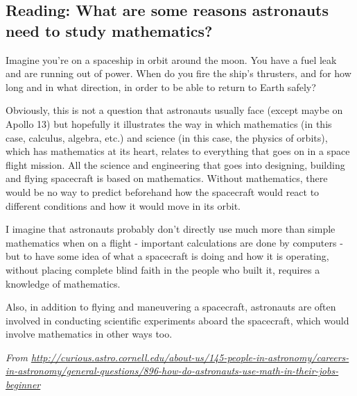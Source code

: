 


\subsection*{Reading: What are some reasons astronauts need to study mathematics?}
Imagine you're on a spaceship in orbit around the moon. You have a fuel leak and are running out of power. When do you fire the ship's thrusters, and for how long and in what direction, in order to be able to return to Earth safely?

Obviously, this is not a question that astronauts usually face (except maybe on Apollo 13) but hopefully it illustrates the way in which mathematics (in this case, calculus, algebra, etc.) and science (in this case, the physics of orbits), which has mathematics at its heart, relates to everything that goes on in a space flight mission. All the science and engineering that goes into designing, building and flying spacecraft is based on mathematics. Without mathematics, there would be no way to predict beforehand how the spacecraft would react to different conditions and how it would move in its orbit.

I imagine that astronauts probably don't directly use much more than simple mathematics when on a flight - important calculations are done by computers - but to have some idea of what a spacecraft is doing and how it is operating, without placing complete blind faith in the people who built it, requires a knowledge of mathematics.

Also, in addition to flying and maneuvering a spacecraft, astronauts are often involved in conducting scientific experiments aboard the spacecraft, which would involve mathematics in other ways too.

\textit{From \url{http://curious.astro.cornell.edu/about-us/145-people-in-astronomy/careers-in-astronomy/general-questions/896-how-do-astronauts-use-math-in-their-jobs-beginner}}

